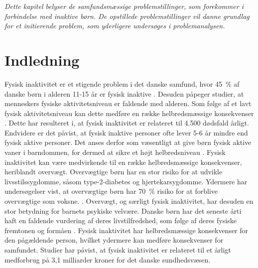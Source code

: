 \textit{Dette kapitel belyser de samfundsmæssige problemstillinger, som forekommer i forbindelse med inaktive børn. De opstillede problemstillinger vil danne grundlag for et initierende problem, som yderligere undersøges i problemanalysen.}

\section{Indledning}
Fysisk inaktivitet er et stigende problem i det danske samfund, hvor 45~\% af danske børn i alderen 11-15 år er fysisk inaktive \citep{Sundhedsstyrelsen2006}. Desuden påpeger studier, at menneskers fysiske aktivitetsniveau er faldende med alderen. Som følge af et lavt fysisk aktivitetsniveau kan dette medføre en række helbredsmæssige konsekvenser \citep{Sundhedsstyrelsen2006}. Dette har resulteret i, at fysisk inaktivitet er relateret til 4.500 dødsfald årligt. Endvidere er det påvist, at fysisk inaktive personer ofte lever 5-6 år mindre end fysisk aktive personer. \citep{RISIKOFAKTORER} Det anses derfor som væsentligt at give børn fysisk aktive vaner i barndommen, for dermed at sikre et højt helbredsniveau \citep{L.MeyerP.Gullotta2012}. \newline
Fysisk inaktivitet kan være medvirkende til en række helbredsmæssige konsekvenser, heriblandt overvægt. Overvægtige børn har en stor risiko for at udvikle
livsstilssygdomme, såsom type-2-diabetes og hjertekarsygdomme. Ydermere har undersøgelser vist, at overvægtige børn har 70~\% risiko for at forblive overvægtige som voksne. \citep{Reilly2006}. Overvægt, og særligt fysisk inaktivitet, har desuden en stor betydning for barnets psykiske velvære. Danske børn har det seneste årti haft en faldende vurdering af deres livstilfredshed, som følge af deres fysiske fremtonen og formåen \citep{Universitet2014,StatensInstitutforFolkesundhed2007}. \newline
Fysisk inaktivitet har helbredsmæssige konsekvenser for den pågældende person, hvilket ydermere kan medføre konsekvenser for samfundet. Studier har påvist, at fysisk inaktivitet er relateret til et årligt medforbrug på 3,1 milliarder kroner for det danske sundhedsvæsen. \citep{RISIKOFAKTORER}

